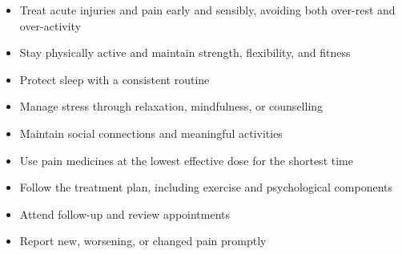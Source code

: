 \begin{itemize}
    \item Treat acute injuries and pain early and sensibly, avoiding both over-rest and over-activity
    \item Stay physically active and maintain strength, flexibility, and fitness
    \item Protect sleep with a consistent routine
    \item Manage stress through relaxation, mindfulness, or counselling
    \item Maintain social connections and meaningful activities
    \item Use pain medicines at the lowest effective dose for the shortest time
    \item Follow the treatment plan, including exercise and psychological components
    \item Attend follow-up and review appointments
    \item Report new, worsening, or changed pain promptly
\end{itemize}
